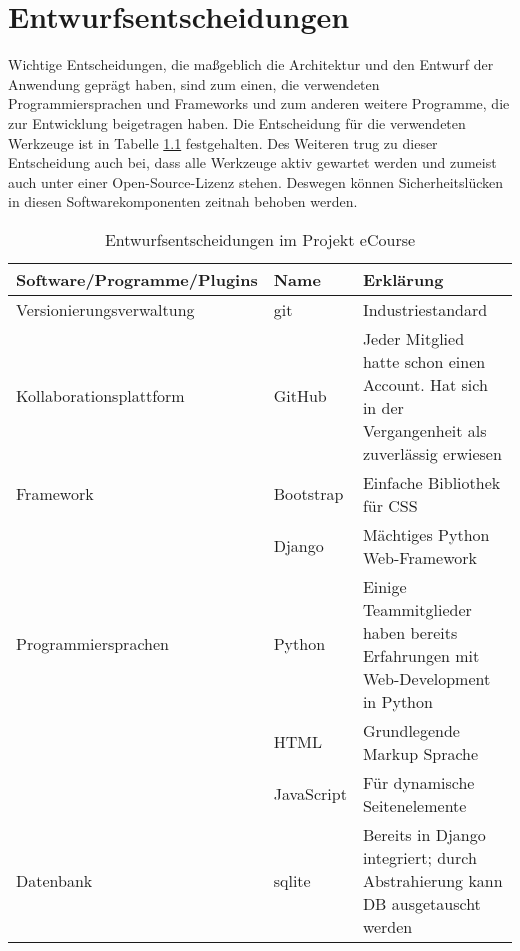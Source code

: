 \chapter{Entwurfsentscheidungen}
\label{sec:Entwurf}
Wichtige Entscheidungen, die maßgeblich die Architektur und den Entwurf der Anwendung geprägt haben, sind zum einen, die verwendeten Programmiersprachen und \gls{Framework}s und zum anderen weitere Programme, die zur Entwicklung beigetragen haben.
Die Entscheidung für die verwendeten Werkzeuge ist in Tabelle \ref{tab:Entwurfsentscheidungen} festgehalten. Des Weiteren trug zu dieser Entscheidung auch bei, dass alle Werkzeuge aktiv gewartet werden  und zumeist auch unter einer Open-Source-Lizenz stehen.  Deswegen können Sicherheitslücken in diesen Softwarekomponenten zeitnah behoben werden. 

\begin{table}[H]
\centering
\begin{tabularx}{\textwidth}{|l|l|X|} 
 \hline 
Software/Programme/Plugins & Name & Erklärung \\ 
\hline
Versionierungsverwaltung & git & Industriestandard \\ 
\hline
Kollaborationsplattform & GitHub & Jeder Mitglied hatte schon einen Account. Hat sich in der Vergangenheit als zuverlässig erwiesen \\ 
\hline
Framework & Bootstrap & Einfache Bibliothek für CSS \\ 
\hline
 & Django & Mächtiges Python Web-Framework \\ 
\hline
Programmiersprachen & Python & Einige Teammitglieder haben bereits Erfahrungen mit Web-Development in Python \\ 
\hline
 & HTML & Grundlegende Markup Sprache  \\ 
\hline
 & JavaScript & Für dynamische Seitenelemente \\ 
\hline
Datenbank & sqlite & Bereits in Django integriert; durch Abstrahierung kann DB ausgetauscht werden \\ 
\hline
\end{tabularx}
\caption{Entwurfsentscheidungen im Projekt eCourse}
\label{tab:Entwurfsentscheidungen}
\end{table}
